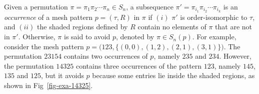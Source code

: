 \documentclass[12pt]{article}
\begin{document}
Given a permutation $\pi = \pi_1 \pi_2 \cdots \pi_n \in S_n$, a subsequence $\pi' = \pi_{i_1} \pi_{i_2} \cdots \pi_{i_k}$ is an \emph{occurrence} of a mesh pattern $p = (\tau, R)$ in $\pi$ if $(i)$ $\pi'$ is order-isomorphic to $\tau$, and $(ii)$ the shaded regions defined by $R$ contain no elements of $\pi$ that are not in $\pi'$.
Otherwise, $\pi$ is said to avoid $p$, denoted by $\pi \in S_n(p)$. 
 For example, consider the mesh pattern $p=\bigl(123,\{(0,0),(1,2),(2,1),(3,1)\}\bigr)$.  
The permutation $23154$ contains two occurrences of $p$, namely $235$ and $234$.
However, the permutation $14325$ contains three occurrences of the pattern $123$, namely $145$, $135$ and $125$, but it avoids $p$ because some entries lie inside the shaded regions, as shown in Fig~\ref{fig-exa-14325}.

 


	
\end{document}
